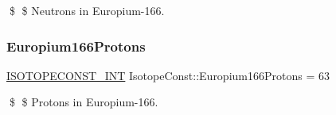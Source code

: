 \$ \$ Neutrons in Europium-\/166. \mbox{\label{group___isotope_const-_europium-_eu166_gac447218b2c886b963958b87fb8cca725}} 
\subsubsection{\texorpdfstring{Europium166\+Protons}{Europium166Protons}}
{\footnotesize\ttfamily \mbox{\hyperlink{group___isotope_const-_macros_ga5f18360b3e99483a35c32d789e62621c}{I\+S\+O\+T\+O\+P\+E\+C\+O\+N\+S\+T\+\_\+\+I\+NT}} Isotope\+Const\+::\+Europium166\+Protons = 63}

\$ \$ Protons in Europium-\/166. 